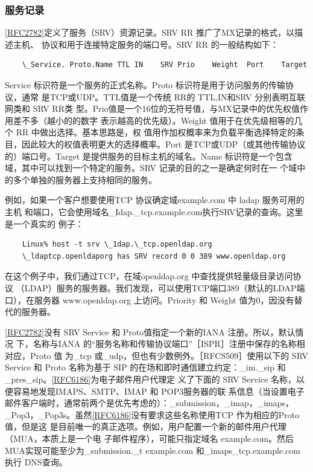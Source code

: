 \subsubsection{服务记录}

\href{https://www.rfc-editor.org/rfc/rfc2782}{[RFC2782]}定义了服务（SRV）资源记录。SRV RR 推广了MX记录的格式，以描述主机、
协议和用于连接特定服务的端口号。SRV RR 的一般结构如下：

\begin{verbatim}
    \_Service. Proto.Name TTL IN    SRV Prio    Weight  Port    Target
\end{verbatim}

Service 标识符是一个服务的正式名称。Proto 标识符是用于访问服务的传输协议，通常
是TCP或UDP。TTL值是一个传统 RR的 TTL,IN和SRV 分别表明互联网类和 SRV RR类
型。Prio值是一个16位的无符号值，与MX记录中的优先权值作用差不多（越小的的数字
表示越高的优先级）。Weight 值用于在优先级相等的几个 RR 中做出选择。基本思路是，权
值用作加权概率来为负载平衡选择特定的条目，因此较大的权值表明更大的选择概率。Port
是TCP或UDP（或其他传输协议的）端口号。Target 是提供服务的目标主机的域名。Name
标识符是一个包含域，其中可以找到一个特定的服务。SRV 记录的目的之一是确定何时在一
个域中的多个单独的服务器上支持相同的服务。

例如，如果一个客户想要使用TCP 协议确定域example.com 中 ladap 服务可用的主机
和端口，它会使用域名\_Idap.\_tcp.example.com执行SRV记录的查询。这里是一个真实的
例子：

\begin{verbatim}
    Linux% host -t srv \_1dap.\_tcp.openldap.org
    \_ldaptcp.openldaporg has SRV record 0 0 389 www.openldap.org
\end{verbatim}

在这个例子中，我们通过TCP，在域openldap.org 中查找提供轻量级目录访问协议
（LDAP）服务的服务器。我们发现，可以使用TCP端口389（默认的LDAP端口），在服务器
www.openldap.org 上访问。Priority 和 Weight 值为0，因没有替代的服务器。

\href{https://www.rfc-editor.org/rfc/rfc2782}{[RFC2782]}没有 SRV Service 和 Proto值指定一个新的IANA 注册。所以，默认情况
下，名称与IANA 的“服务名称和传输协议端口”［ISPR］注册中保存的名称相对应，Proto 值
为\_tcp 或\_udp，但也有少数例外。［RFCS509］使用以下的 SRV Service 和 Proto 名称为基于
SIP 的在场和即时通信建立约定：\_im.\_sip 和\_pres\_sip。\href{https://www.rfc-editor.org/rfc/rfc6186}{[RFC6186]}为电子邮件用户代理定
义了下面的 SRV Service 名称，以便容易地发现IMAPS、SMTP、IMAP 和 POP3服务器的联
系信息（当设置电子邮件客户端时，通常前两个是优先考虑的）：\_submission，\_imap，\_imaps，
\_Pop3，\_Pop3s。虽然\href{https://www.rfc-editor.org/rfc/rfc6186}{[RFC6186]}没有要求这些名称使用TCP 作为相应的Proto 值，但是这
是目前唯一的真正选项。例如，用户配置一个新的邮件用户代理（MUA，本质上是一个电
子邮件程序），可能只指定域名 example.com。然后MUA实现可能至少为\_submission.\_t
example.com 和\_imaps\_tcp.example.com 执行 DNS查询。

